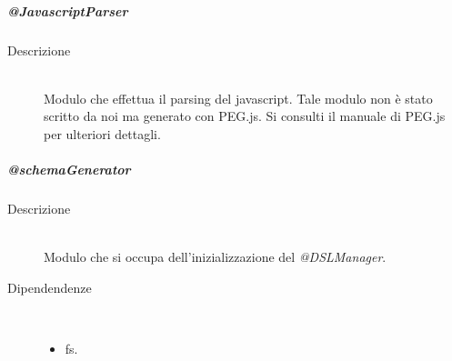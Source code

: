 \subparagraph{@JavascriptParser}
\begin{description}
 \item[Descrizione] \hfill \\
  Modulo che effettua il parsing del javascript. Tale modulo non è stato scritto da noi ma generato con PEG.js. Si consulti il manuale di PEG.js per ulteriori dettagli.
  
 
\end{description}
\subparagraph{@schemaGenerator}
\begin{description}
 \item[Descrizione] \hfill \\
  Modulo che si occupa dell'inizializzazione del \textit{@DSLManager}.
 \item[Dipendendenze] \hfill \\
 \begin{itemize}
  \item{fs}.
 \end{itemize}
  

\end{description}
